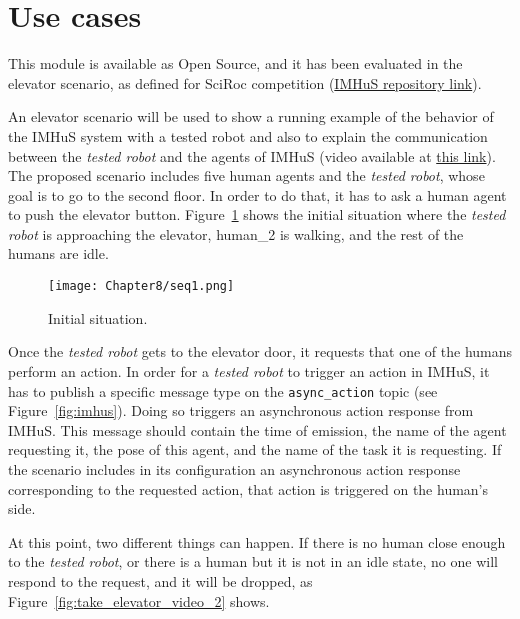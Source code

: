 \section{Use cases}
\label{sec:useCases}


This module is available as Open Source, and it has been evaluated in the elevator scenario, as defined for SciRoc competition (\href{https://github.com/LAAS-HRI/IMHuS}{IMHuS repository link}). %

An elevator scenario will be used to show a running example of the behavior of the IMHuS system with a tested robot and also to explain the communication between the \textit{tested robot} and the agents of IMHuS (video available at \href{https://github.com/LAAS-HRI/IMHuS/videos}{this link}). The proposed scenario includes five human agents and the \textit{tested robot}, whose goal is to go to the second floor. In order to do that, it has to ask a human agent to push the elevator button. Figure~\ref{fig:take_elevator_video_1} shows the initial situation where the \textit{tested robot} is approaching the elevator, human\_2 is walking, and the rest of the humans are idle.

\begin{figure}[!ht]
  \centering
  {\texttt{[image: Chapter8/seq1.png]}}\\
  \caption{Initial situation.}
  \label{fig:take_elevator_video_1}
\end{figure}

Once the \textit{tested robot} gets to the elevator door, it requests that one of the humans perform an action. In order for a \textit{tested robot} to trigger an action in IMHuS, it has to publish a specific message type on the \texttt{async\_action} topic (see Figure~\ref{fig:imhus}). Doing so triggers an asynchronous action response from IMHuS. This message should contain the time of emission, the name of the agent requesting it, the pose of this agent, and the name of the task it is requesting. If the scenario includes in its configuration an asynchronous action response corresponding to the requested action, that action is triggered on the human's side.

At this point, two different things can happen. If there is no human close enough to the \textit{tested robot}, or there is a human but it is not in an idle state, no one will respond to the request, and it will be dropped, as Figure~\ref{fig:take_elevator_video_2} shows.

